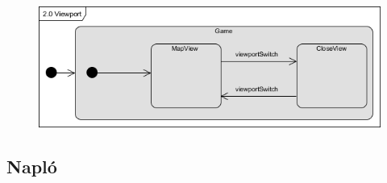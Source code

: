 		\begin{figure}[h!]
			\begin{center}
				\includegraphics[scale=0.8]{resources/state_2-0_viewport.png}
				\caption{}
			\end{center}
		\end{figure}
	
	\subsection{Napló}

